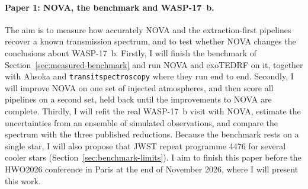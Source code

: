 \paragraph{Paper 1: NOVA, the benchmark and WASP-17~b.} The aim is to measure
how accurately NOVA and the extraction-first pipelines recover a known
transmission spectrum, and to test whether NOVA changes the conclusions about
WASP-17~b. Firstly, I will finish the benchmark of
Section~\ref{sec:measured-benchmark} and run NOVA and exoTEDRF on it, together
with Ahsoka and \texttt{transitspectroscopy} where they run end to end.
Secondly, I will improve NOVA on one set of injected atmospheres, and then
score all pipelines on a second set, held back until the improvements to NOVA are complete. Thirdly, I
will refit the real WASP-17~b visit with NOVA, estimate the uncertainties
from an ensemble of simulated observations, and compare the spectrum with the three
published reductions. Because the benchmark rests on a single star, I will
also propose that JWST repeat programme 4476 for several cooler stars (Section~\ref{sec:benchmark-limits}). I
aim to finish this paper before the HWO2026 conference in Paris at the end of
November 2026, where I will present this work.

